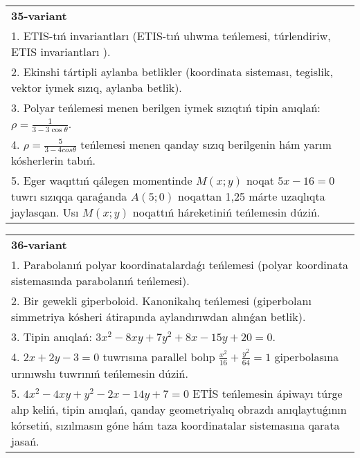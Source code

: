 \documentclass{article}
\begin{document}
\begin{tabular}{m{17cm}}
\textbf{35-variant}\\
1. ETIS-tıń invariantları (ETIS-tıń ulıwma teńlemesi, túrlendiriw, ETIS invariantları ).\\

2. Ekinshi tártipli aylanba betlikler (koordinata sisteması, tegislik, vektor iymek sızıq, aylanba betlik).\\

3. Polyar teńlemesi menen berilgen iymek sızıqtıń tipin anıqlań: $\rho=\frac{1}{3-3\cos\theta}$.\\

4. $\rho = \frac{5}{3 - 4cos\theta}$ teńlemesi menen qanday sızıq berilgenin hám yarım kósherlerin tabıń.  \\

5. Eger waqıttıń qálegen momentinde $M(x;y)$ noqat $5x - 16 = 0$ tuwrı sızıqqa qaraǵanda $A(5;0)$ noqattan 1,25 márte uzaqlıqta jaylasqan. Usı $M(x;y)$ noqattıń háreketiniń teńlemesin dúziń.  
\end{tabular}
\vspace{1cm}


\begin{tabular}{m{17cm}}
\textbf{36-variant}\\
1. Parabolanıń polyar koordinatalardaǵı teńlemesi (polyar koordinata sistemasında parabolanıń teńlemesi).\\

2. Bir gewekli giperboloid. Kanonikalıq teńlemesi (giperbolanı simmetriya kósheri átirapında aylandırıwdan alınǵan betlik).\\

3. Tipin anıqlań: $3 x^{2}-8 xy+7 y^{2}+8 x-15 y+20=0$.\\

4. $2x + 2y - 3 = 0$ tuwrısına parallel bolıp $\frac{x^{2}}{16} + \frac{y^{2}}{64} = 1$ giperbolasına urınıwshı tuwrınıń teńlemesin dúziń.  \\

5. $4x^{2} - 4xy + y^{2} - 2x - 14y + 7 = 0$ ETİS teńlemesin ápiwayı túrge alıp keliń, tipin anıqlań, qanday geometriyalıq obrazdı anıqlaytuǵının kórsetiń, sızılmasın góne hám taza koordinatalar sistemasına qarata jasań.  
\end{tabular}
\vspace{1cm}
\end{document}
